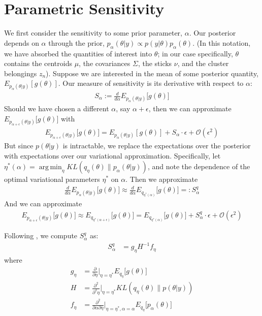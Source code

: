 \documentclass[a4paper]{article}
\DeclareMathOperator*{\argmin}{arg\,min}
\begin{document}
\section{Parametric Sensitivity}
We first consider the sensitivity to some prior parameter, $\alpha$. Our posterior depends on $\alpha$ through
the prior, $p_{\alpha}(\theta | y) \propto p(y |\theta) p_\alpha(\theta)$. (In this notation, we have absorbed the
quantities of interest into $\theta$; in our case specifically, $\theta$ contains the centroids $\mu$, the covariances
$\Sigma$, the sticks $\nu$, and the cluster belongings $z_n$). Suppose we are interested in the mean of some posterior
quantity, $E_{p_{\alpha}(\theta | y)}[g(\theta)]$. Our measure of sensitivity is its derivative with respect to $\alpha$:
\begin{align}
  S_\alpha := \frac{d}{d\alpha}E_{p_{\alpha}(\theta | y)} \big[g(\theta)\big]
\end{align}
Should we have chosen a different $\alpha$, say $\alpha + \epsilon$, then we can approximate
$E_{p_{\alpha + \epsilon}(\theta | y)} \big[g(\theta)\big]$ with
\begin{align}
  E_{p_{\alpha + \epsilon}(\theta | y)} \big[g(\theta)\big] = E_{p_{\alpha}(\theta | y)}[g(\theta)] +
    S_\alpha \cdot \epsilon + \mathcal{O}(\epsilon^2)
\end{align}
But since $p(\theta | y)$ is intractable, we replace the expectations over the posterior with expectations over
our variational approximation. Specifically, let $\eta^*(\alpha) =
\argmin_\eta KL(q_\eta\left(\theta\right) \| p_{\alpha}(\theta | y))$, and note the
dependence of the optimal variational parameters $\eta^*$ on $\alpha$. Then we approximate
\begin{align}
  \frac{d}{d\alpha}E_{p_{\alpha}(\theta | y)} \big[g(\theta)\big] \approx
  \frac{d}{d\alpha}E_{q_{\eta^*(\alpha)}} \big[g(\theta)\big] =: S_\alpha^q
\end{align}
And we can approximate
\begin{align}
  E_{p_{\alpha + \epsilon}(\theta | y)} \big[g(\theta)\big] \approx E_{q_{\eta^*(\alpha + \epsilon)}} \big[g(\theta)\big] = E_{q_{\eta^*(\alpha)}}\big[g(\theta)\big] +
    S_\alpha^q \cdot \epsilon + \mathcal{O}(\epsilon^2)
    \label{eq:our_approximation}
\end{align}

Following \cite{giordano_2017},  we compute $S^q_\alpha$ as:
\begin{align}
  S^q_\alpha &=
    g_\eta H^{-1} f_\eta \label{eq:vb_sensitivty}
\end{align}
where
\begin{align}
  g_\eta &= \frac{\partial}{\partial \eta}\Big\rvert_{\eta = \eta^*} E_{q_{\eta}} \big[g(\theta)\big] \\
  H &= \frac{\partial^2}{\partial^2\eta}\Big\rvert_{\eta = \eta^*} KL(q_\eta\left(\theta\right) \| p(\theta | y)) \\
  f_\eta &= \frac{\partial^2}{\partial \alpha \partial \eta}\Big\rvert_{\eta = \eta^*, \alpha = \alpha} E_{q_{\eta}} \big[p_\alpha(\theta)\big]
\end{align}
\end{document}
